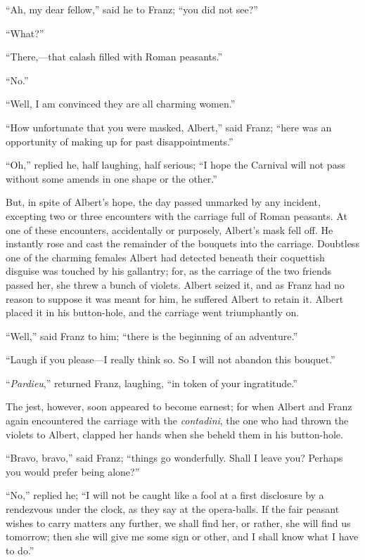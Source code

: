 “Ah, my dear fellow,” said he to Franz; “you did not see?”

“What?”

“There,—that calash filled with Roman peasants.”

“No.”

“Well, I am convinced they are all charming women.”

“How unfortunate that you were masked, Albert,” said Franz; “here was
an opportunity of making up for past disappointments.”

“Oh,” replied he, half laughing, half serious; “I hope the Carnival
will not pass without some amends in one shape or the other.”

But, in spite of Albert’s hope, the day passed unmarked by any
incident, excepting two or three encounters with the carriage full of
Roman peasants. At one of these encounters, accidentally or purposely,
Albert’s mask fell off. He instantly rose and cast the remainder of the
bouquets into the carriage. Doubtless one of the charming females
Albert had detected beneath their coquettish disguise was touched by
his gallantry; for, as the carriage of the two friends passed her, she
threw a bunch of violets. Albert seized it, and as Franz had no reason
to suppose it was meant for him, he suffered Albert to retain it.
Albert placed it in his button-hole, and the carriage went triumphantly
on.

“Well,” said Franz to him; “there is the beginning of an adventure.”

“Laugh if you please—I really think so. So I will not abandon this
bouquet.”

“\textit{Pardieu},” returned Franz, laughing, “in token of your ingratitude.”

The jest, however, soon appeared to become earnest; for when Albert and
Franz again encountered the carriage with the \textit{contadini}, the one who
had thrown the violets to Albert, clapped her hands when she beheld
them in his button-hole.

“Bravo, bravo,” said Franz; “things go wonderfully. Shall I leave you?
Perhaps you would prefer being alone?”

“No,” replied he; “I will not be caught like a fool at a first
disclosure by a rendezvous under the clock, as they say at the
opera-balls. If the fair peasant wishes to carry matters any further,
we shall find her, or rather, she will find us tomorrow; then she will
give me some sign or other, and I shall know what I have to do.”

